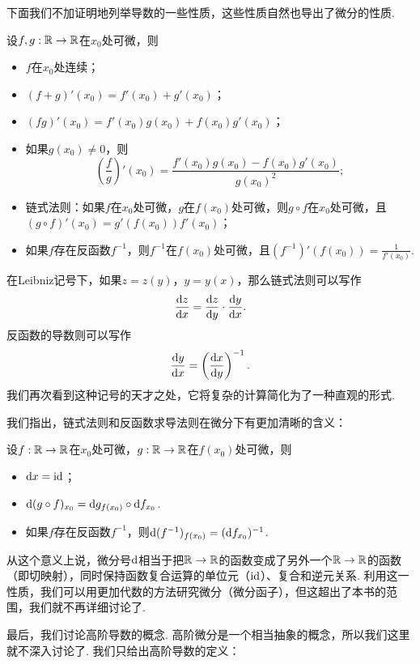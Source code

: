 下面我们不加证明地列举导数的一些性质，这些性质自然也导出了微分的性质. 

\begin{proposition}\label{prop:uni-derivative-property}
    设$f,g:\mathbb{R}\to\mathbb{R}$在$x_0$处可微，则
    \begin{itemize}
        \item $f$在$x_0$处连续；
        \item $(f+g)'(x_0)=f'(x_0)+g'(x_0)$；
        \item $(fg)'(x_0)=f'(x_0)g(x_0)+f(x_0)g'(x_0)$；
        \item 如果$g(x_0)\neq 0$，则
        \[\left(\frac{f}{g}\right)'(x_0)=\frac{f'(x_0)g(x_0)-f(x_0)g'(x_0)}{g(x_0)^2};\]
        \item 链式法则：如果$f$在$x_0$处可微，$g$在$f(x_0)$处可微，则$g\circ f$在$x_0$处可微，且$(g\circ f)'(x_0)=g'(f(x_0))f'(x_0)$；
        \item 如果$f$存在反函数$f^{-1}$，则$f^{-1}$在$f(x_0)$处可微，且$(f^{-1})'(f(x_0))=\frac{1}{f'(x_0)}$.
    \end{itemize}
\end{proposition}
在Leibniz记号下，如果$z=z(y)$，$y=y(x)$，那么链式法则可以写作
\[
    \frac{\mathrm{d} z}{\mathrm{d} x}=\frac{\mathrm{d} z}{\mathrm{d} y}\cdot\frac{\mathrm{d} y}{\mathrm{d} x}.
\]
反函数的导数则可以写作
\[
    \frac{\mathrm{d} y}{\mathrm{d} x}=\left(\frac{\mathrm{d} x}{\mathrm{d} y}\right)^{-1}.
\]
我们再次看到这种记号的天才之处，它将复杂的计算简化为了一种直观的形式.

我们指出，链式法则和反函数求导法则在微分下有更加清晰的含义：

\begin{proposition}\label{prop:derivative-geometric}
设$f:\mathbb{R}\to\mathbb{R}$在$x_0$处可微，$g:\mathbb{R}\to\mathbb{R}$在$f(x_0)$处可微，则
\begin{itemize}
    \item $\mathrm{d} x=\mathrm{id}$；
    \item $\mathrm{d}(g\circ f)_{x_0}=\mathrm{d} g_{f(x_0)}\circ\mathrm{d} f_{x_0}$.
    \item  如果$f$存在反函数$f^{-1}$，则$\mathrm{d}(f^{-1})_{f(x_0)}=(\mathrm{d} f_{x_0})^{-1}$.
\end{itemize}
\end{proposition}

从这个意义上说，微分号$\mathrm{d}$相当于把$\mathbb{R}\to\mathbb{R}$的函数变成了另外一个$\mathbb{R}\to\mathbb{R}$的函数（即切映射），同时保持函数复合运算的单位元（$\mathrm{id}$）、复合和逆元关系. 利用这一性质，我们可以用更加代数的方法研究微分（微分函子），但这超出了本书的范围，我们就不再详细讨论了.

最后，我们讨论高阶导数的概念. 高阶微分是一个相当抽象的概念，所以我们这里就不深入讨论了. 我们只给出高阶导数的定义：

